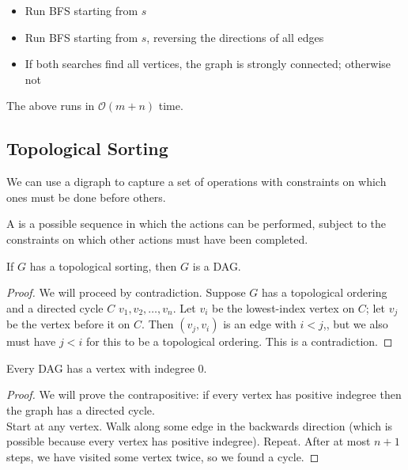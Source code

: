 \documentclass[12pt]{scrartcl}
\begin{document}
\begin{itemize}
    \item Run BFS starting from $s$
    \item Run BFS starting from $s$, reversing the directions of all edges
    \item If both searches find all vertices, the graph is strongly connected; otherwise not
\end{itemize}

The above runs in $\mathcal{O}(m+n)$ time. \\

\subsection{Topological Sorting}
We can use a digraph to capture a set of operations with constraints on which ones must be done before others. 

\begin{definition}
    A  is a possible sequence in which the actions can be performed, subject to the constraints on which other actions must have been completed.
\end{definition}

\begin{lemma}
    If $G$ has a topological sorting, then $G$ is a DAG.
\end{lemma}

\begin{proof}
    We will proceed by contradiction. Suppose $G$ has a topological ordering and a directed cycle $C$ $v_1, v_2, \ldots, v_n$. Let $v_i$ be the lowest-index vertex on $C$; let $v_j$ be the vertex before it on $C$. Then $(v_j, v_i)$ is an edge with $i < j$,, but we also must have $j < i$ for this to be a topological ordering. This is a contradiction.
\end{proof}

\begin{lemma}
    Every DAG has a vertex with indegree $0$.
\end{lemma}

\begin{proof}
    We will prove the contrapositive: if every vertex has positive indegree then the graph has a directed cycle. \\

    Start at any vertex. Walk along some edge in the backwards direction (which is possible because every vertex has positive indegree). Repeat. After at most $n+1$ steps, we have visited some vertex twice, so we found a cycle.
\end{proof}
\end{document}
